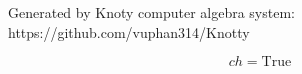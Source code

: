 \documentclass[letterpaper, 10pt]{extarticle}
\begin{document}
Generated by Knoty computer algebra system:
https://github.com/vuphan314/Knotty

\bigskip

\begin{dmath*}
ch =
    \mathrm{True}
\end{dmath*}
\end{document}
